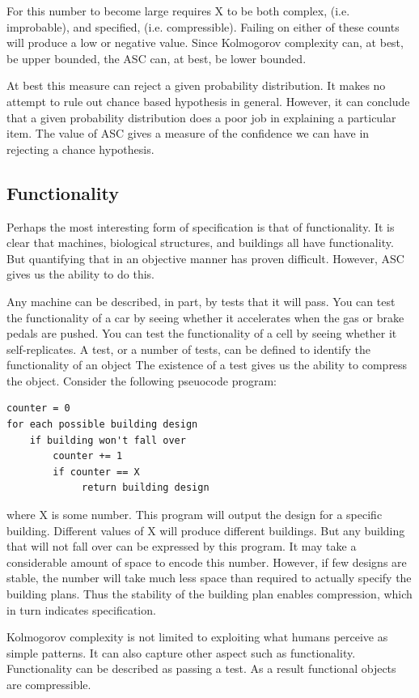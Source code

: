 For this number to become large requires X to be both complex, (i.e. improbable), and specified, (i.e. compressible).
Failing on either of these counts will produce a low or negative value.
Since Kolmogorov complexity can, at best, be upper bounded, the ASC can, at best, be lower bounded.

At best this measure can reject a given probability distribution.
It makes no attempt to rule out chance based hypothesis in general.
However, it can conclude that a given probability distribution does a poor job in explaining a particular item.
The value of ASC gives a measure of the confidence we can have in rejecting a chance hypothesis.

\subsection{Functionality}

Perhaps the most interesting form of specification is that of functionality.
It is clear that machines, biological structures, and buildings all have functionality.
But quantifying that in an objective manner has proven difficult.
However, ASC gives us the ability to do this.

Any machine can be described, in part, by tests that it will pass.
You can test the functionality of a car by seeing whether it accelerates when the gas or brake pedals are pushed.
You can test the functionality of a cell by seeing whether it self-replicates.
A test, or a number of tests, can be defined to identify the functionality of an object 
The existence of a test gives us the ability to compress the object.
Consider the following pseuocode program:
\begin{verbatim}
counter = 0
for each possible building design
    if building won't fall over
        counter += 1
        if counter == X
             return building design
\end{verbatim} where X is some number.
This program will output the design for a specific building.
Different values of X will produce different buildings.
But any building that will not fall over can be expressed by this program.
It may take a considerable amount of space to encode this number.
However, if few designs are stable, the number will take much less space than required to actually specify the building plans.
Thus the stability of the building plan enables compression, which in turn indicates specification.

Kolmogorov complexity is not limited to exploiting what humans perceive as simple patterns.
It can also capture other aspect such as functionality.
Functionality can be described as passing a test.
As a result functional objects are compressible.


